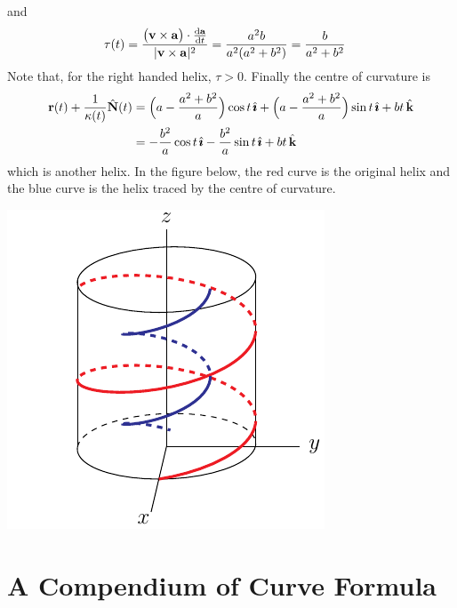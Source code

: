 \begin{eg}
and
\begin{align*}
\tau(t) & = \frac{\big(\vv\times\va\big)\cdot \diff{\va}{t} }{|\vv\times\va|^2}
=\frac{a^2b}{a^2(a^2+b^2)}
=\frac{b}{a^2+b^2}
\end{align*}
Note that, for the right handed helix, $\tau>0$. Finally the centre of 
curvature is
\begin{align*}
\mathbf{r}(t) +\frac{1}{\kappa(t)}\hat{\mathbf{N}}(t)
&=\Big(a-\frac{a^2+b^2}{a}\Big)\cos t\,\hat{\pmb{\imath}}
 +\Big(a-\frac{a^2+b^2}{a}\Big)\sin t\,\hat{\pmb{\imath}}
 +bt\,\hat{\mathbf{k}} \\
&=-\frac{b^2}{a}\cos t\,\hat{\pmb{\imath}}
  -\frac{b^2}{a}\sin t\,\hat{\pmb{\imath}}
 +bt\,\hat{\mathbf{k}} 
\end{align*}
which is another helix. In the figure below, the red curve is the original
helix and the blue curve is the helix traced by the centre of curvature.
\begin{nfig}
\begin{center}
    \includegraphics{helix6.pdf}
\end{center}
\end{nfig}

\end{eg}



\section{A Compendium of Curve Formula}\label{sec:CurveCompendium}

